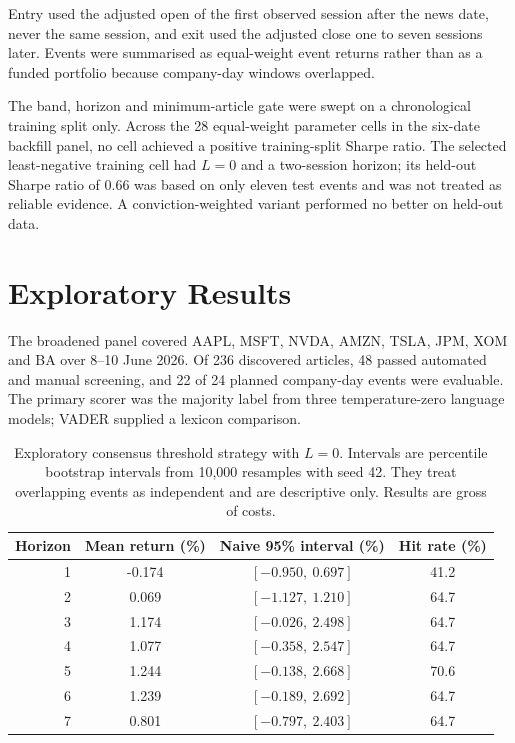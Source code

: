 \documentclass[11pt,a4paper,oneside]{book}
\begin{document}
Entry used the adjusted open of the first observed session after the news date, never the same session, and exit used the adjusted close one to seven sessions later.
Events were summarised as equal-weight event returns rather than as a funded portfolio because company-day windows overlapped.

The band, horizon and minimum-article gate were swept on a chronological training split only.
Across the 28 equal-weight parameter cells in the six-date backfill panel, no cell achieved a positive training-split Sharpe ratio.
The selected least-negative training cell had $L=0$ and a two-session horizon; its held-out Sharpe ratio of 0.66 was based on only eleven test events and was not treated as reliable evidence.
A conviction-weighted variant performed no better on held-out data.

\section{Exploratory Results}

The broadened panel covered AAPL, MSFT, NVDA, AMZN, TSLA, JPM, XOM and BA over 8--10 June 2026.
Of 236 discovered articles, 48 passed automated and manual screening, and 22 of 24 planned company-day events were evaluable.
The primary scorer was the majority label from three temperature-zero language models; VADER supplied a lexicon comparison.

\begin{table}[htbp]
  \centering
  \small
  \begin{tabular}{rccc}
    \toprule
    Horizon & Mean return (\%) & Naive 95\% interval (\%) & Hit rate (\%) \\
    \midrule
    1 & -0.174 & $[-0.950,\ 0.697]$ & 41.2 \\
    2 &  0.069 & $[-1.127,\ 1.210]$ & 64.7 \\
    3 &  1.174 & $[-0.026,\ 2.498]$ & 64.7 \\
    4 &  1.077 & $[-0.358,\ 2.547]$ & 64.7 \\
    5 &  1.244 & $[-0.138,\ 2.668]$ & 70.6 \\
    6 &  1.239 & $[-0.189,\ 2.692]$ & 64.7 \\
    7 &  0.801 & $[-0.797,\ 2.403]$ & 64.7 \\
    \bottomrule
  \end{tabular}
  \caption{Exploratory consensus threshold strategy with $L=0$. Intervals are percentile bootstrap intervals from 10,000 resamples with seed 42. They treat overlapping events as independent and are descriptive only. Results are gross of costs.}
  \label{tab:exploratory-threshold}
\end{table}
\end{document}
